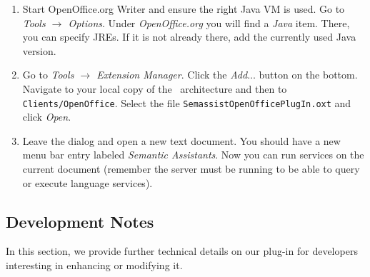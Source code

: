 \begin{enumerate}

  \item Start OpenOffice.org Writer and ensure the right Java VM is
  used. Go to \emph{Tools $\rightarrow$ Options}. Under
  \emph{OpenOffice.org} you will find a \emph{Java} item. There, you
  can specify JREs. If it is not already there, add the currently used
  Java version.
  
  \item Go to \emph{Tools $\rightarrow$ Extension Manager}. Click the
    \emph{Add$\ldots$} button on the bottom. Navigate to your local
    copy of the \sa\ architecture and then to
    \texttt{Clients/OpenOffice}. Select the file
    \texttt{SemassistOpenOfficePlugIn.oxt} and click \emph{Open}.

  \item Leave the dialog and open a new text document. You should have
    a new menu bar entry labeled \emph{Semantic Assistants}. Now you
    can run services on the current document (remember the server must
    be running to be able to query or execute language services).
\end{enumerate}


\subsection{Development Notes}
\label{sec:oo-spec}
In this section, we provide further technical details on our plug-in
for developers interesting in enhancing or modifying it.

